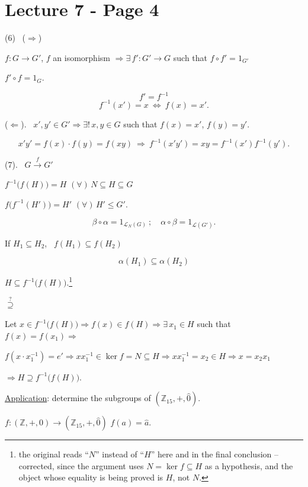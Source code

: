 \section*{Lecture 7 - Page 4}

\noindent (6) \ ($\Rightarrow$)

\noindent $f:G\to G'$, $f$ an isomorphism $\Rightarrow \exists\,f':G'\to G$ such that $f\circ f'=1_{G'}$

\noindent $f'\circ f=1_G$.

\[
f'=f^{-1}
\]
\[
f^{-1}(x')=x \ \Leftrightarrow \ f(x)=x'.
\]

\bigskip
\noindent ($\Leftarrow$). \ $x',y'\in G' \Rightarrow \exists!\,x,y\in G$ such that $f(x)=x'$, $f(y)=y'$.

\[
x'y' = f(x)\cdot f(y) = f(xy) \ \Rightarrow \ f^{-1}(x'y') = xy = f^{-1}(x')f^{-1}(y').
\]

\bigskip
\noindent (7). \ $G \xrightarrow{f} G'$

\noindent $f^{-1}\big(f(H)\big)= H$ \quad $(\forall)\,N\subseteq H\subseteq G$

\noindent $f\big(f^{-1}(H')\big) = H'$ \quad $(\forall)\,H'\leq G'$.

\[
\beta\circ\alpha = 1_{\mathcal{L}_N(G)} \ ; \quad \alpha\circ\beta = 1_{\mathcal{L}(G')}.
\]

\bigskip
\noindent If $H_1\subseteq H_2$, \ $f(H_1)\subseteq f(H_2)$

\[
\alpha(H_1) \subseteq \alpha(H_2)
\]

\bigskip
\noindent $H\subseteq f^{-1}\big(f(H)\big)$.\footnote{the original reads ``$N$'' instead of ``$H$'' here and in the final conclusion -- corrected, since the argument uses $N=\ker f\subseteq H$ as a hypothesis, and the object whose equality is being proved is $H$, not $N$.}

\noindent $\overset{?}{\supseteq}$

\noindent Let $x\in f^{-1}\big(f(H)\big) \Rightarrow f(x)\in f(H) \Rightarrow \exists\,x_1\in H$ such that $f(x)=f(x_1) \Rightarrow$

\noindent $f(x\cdot x_1^{-1}) = e' \Rightarrow xx_1^{-1}\in\ker f = N\subseteq H \Rightarrow xx_1^{-1} = x_2\in H \Rightarrow x=x_2x_1$

\noindent $\Rightarrow H\supseteq f^{-1}\big(f(H)\big)$.

\bigskip
\noindent\underline{Application}: determine the subgroups of $(\mathbb{Z}_{15},+,\hat 0)$.

\noindent $f:(\mathbb{Z},+,0) \to (\mathbb{Z}_{15},+,\hat 0)$ \quad $f(a)=\hat a$.

